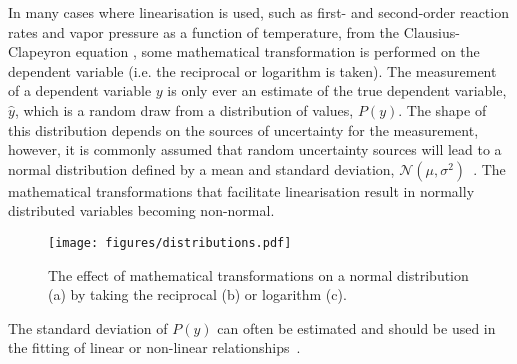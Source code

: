\documentclass[reprint,superscriptaddress,nobibnotes,amsmath,amssymb]{revtex4-2}
\begin{document}
In many cases where linearisation is used, such as first- and second-order reaction rates and vapor pressure as a function of temperature, from the Clausius-Clapeyron equation \cite{perrin_linear_2017,harper_data_2017}, some mathematical transformation is performed on the dependent variable (i.e. the reciprocal or logarithm is taken). 
The measurement of a dependent variable $y$ is only ever an estimate of the true dependent variable, $\hat{y}$, which is a random draw from a distribution of values, $P(y)$. 
The shape of this distribution depends on the sources of uncertainty for the measurement, however, it is commonly assumed that random uncertainty sources will lead to a normal distribution defined by a mean and standard deviation, $\mathcal{N}(\mu, \sigma^2)$~\cite{monk_math_2010}.
The mathematical transformations that facilitate linearisation result in normally distributed variables becoming non-normal.
%
\begin{figure}
  \texttt{[image: figures/distributions.pdf]}
  \caption{
    The effect of mathematical transformations on a normal distribution (a) by taking the reciprocal (b) or logarithm (c).
    }
  \label{fig:distributions}
\end{figure}
%

The standard deviation of $P(y)$ can often be estimated and should be used in the fitting of linear or non-linear relationships~\cite{perrin_linear_2017}.




\end{document}
